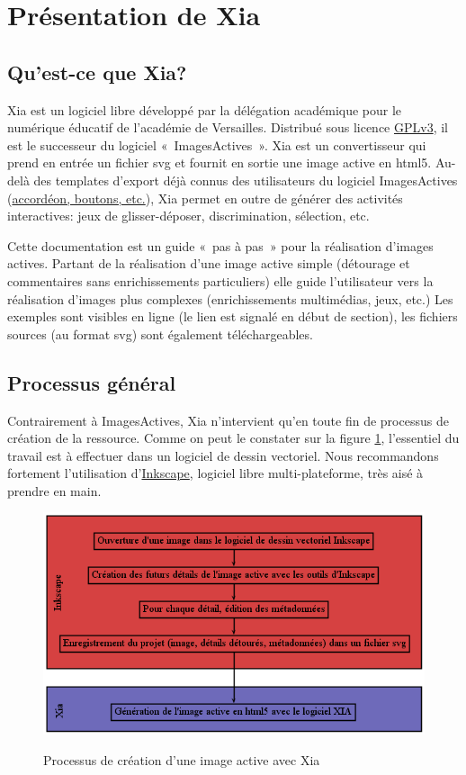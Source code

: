 \documentclass[a4paper,12pt]{report}
\begin{document}
 
\section{Présentation de Xia}

\subsection{Qu'est-ce que Xia?}

Xia est un logiciel libre développé par la délégation académique pour le numérique éducatif de l'académie de Versailles.
Distribué sous licence \href{http://www.gnu.org/copyleft/gpl.html}{GPLv3}, il est le successeur du logiciel «~ImagesActives~».
Xia est un convertisseur qui prend en entrée un fichier svg et fournit en sortie une image active en html5.
Au-delà des templates d'export déjà connus des utilisateurs du logiciel ImagesActives
(\href{http://images-actives.crdp-versailles.fr/spip.php?article11&lang=fr}{accordéon, boutons, etc.}),
Xia permet en outre de générer des activités interactives: jeux de glisser-déposer, discrimination, sélection, etc.

Cette documentation est un guide «~pas à pas~» pour la réalisation d'images actives.
Partant de la réalisation d'une image active simple (détourage et commentaires sans enrichissements particuliers)
elle guide l'utilisateur vers la réalisation d'images plus complexes (enrichissements multimédias, jeux, etc.)
Les exemples sont visibles en ligne (le lien est signalé en début de section), les fichiers sources (au format svg) sont également téléchargeables.

\subsection{Processus général}

Contrairement à ImagesActives, Xia n'intervient qu'en toute fin de processus de création de la ressource.
Comme on peut le constater sur la figure \ref{workflow_xia}, l'essentiel du travail est à effectuer
dans un logiciel de dessin vectoriel.
Nous recommandons fortement l'utilisation d'\href{http://www.inkscape.org/}{Inkscape}, logiciel libre
multi-plateforme, très aisé à prendre en main.

\begin{figure}[htp]
 \centering
 \caption{Processus de création d'une image active avec Xia}
 \includegraphics[width=1\textwidth]{images/workflow_xia}
 \label{workflow_xia}
\end{figure}
\end{document}

